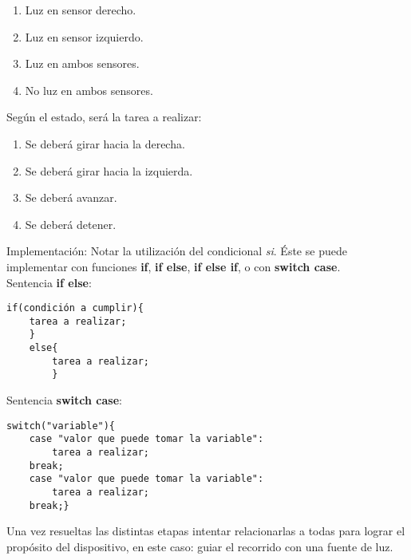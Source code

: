 \documentclass[a4paper,10pt]{article}
\begin{document}
\begin{enumerate}[A]
	\item Luz en sensor derecho.
	\item Luz en sensor izquierdo.
	\item Luz en ambos sensores.
	\item No luz en ambos sensores.
\end{enumerate}

Según el estado, será la tarea a realizar:

\begin{enumerate}[A]
	\item Se deberá girar hacia la derecha.
	\item Se deberá girar hacia la izquierda.
	\item Se deberá avanzar.
	\item Se deberá detener.
\end{enumerate}

Implementación: Notar la utilización del condicional \textit{si}. Éste se puede implementar con funciones \textbf{if}, \textbf{if else}, \textbf{if else if}, o con \textbf{switch case}.\\

Sentencia \textbf{if else}:
\begin{verbatim}
if(condición a cumplir){
	tarea a realizar;
	} 
	else{
		tarea a realizar;
		}
\end{verbatim}

Sentencia \textbf{switch case}:

\begin{verbatim}
switch("variable"){
	case "valor que puede tomar la variable":
		tarea a realizar;
	break;
	case "valor que puede tomar la variable":
		tarea a realizar;
	break;}		

\end{verbatim}


Una vez resueltas las distintas etapas intentar relacionarlas a todas para lograr el propósito del dispositivo, en este caso: guiar el recorrido con una fuente de luz.
\end{document}
